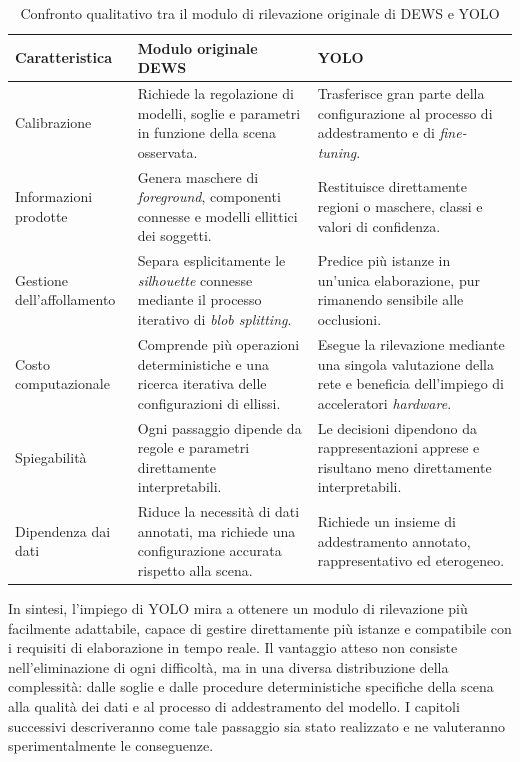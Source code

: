 \begin{table}[htbp]
    \centering
    \caption[Confronto tra il rilevatore originale di DEWS e YOLO]{Confronto qualitativo tra il modulo di rilevazione originale di DEWS e YOLO}
    \label{tab:confronto-dews-yolo}
    \footnotesize
    \renewcommand{\arraystretch}{1.20}
    \begin{tabularx}{\textwidth}{|>{\raggedright\arraybackslash}m{2.6cm}||>{\raggedright\arraybackslash}X|>{\raggedright\arraybackslash}X|}
        \hline
        Caratteristica & Modulo originale DEWS & YOLO \\
        \hline\hline
        Calibrazione & Richiede la regolazione di modelli, soglie e parametri in funzione della scena osservata. & Trasferisce gran parte della configurazione al processo di addestramento e di \textit{fine-tuning}. \\
        \hline
        Informazioni prodotte & Genera maschere di \textit{foreground}, componenti connesse e modelli ellittici dei soggetti. & Restituisce direttamente regioni o maschere, classi e valori di confidenza. \\
        \hline
        Gestione dell'affollamento & Separa esplicitamente le \textit{silhouette} connesse mediante il processo iterativo di \textit{blob splitting}. & Predice più istanze in un'unica elaborazione, pur rimanendo sensibile alle occlusioni. \\
        \hline
        Costo computazionale & Comprende più operazioni deterministiche e una ricerca iterativa delle configurazioni di ellissi. & Esegue la rilevazione mediante una singola valutazione della rete e beneficia dell'impiego di acceleratori \textit{hardware}. \\
        \hline
        Spiegabilità & Ogni passaggio dipende da regole e parametri direttamente interpretabili. & Le decisioni dipendono da rappresentazioni apprese e risultano meno direttamente interpretabili. \\
        \hline
        Dipendenza dai dati & Riduce la necessità di dati annotati, ma richiede una configurazione accurata rispetto alla scena. & Richiede un insieme di addestramento annotato, rappresentativo ed eterogeneo. \\
        \hline
    \end{tabularx}
\end{table}

In sintesi, l'impiego di YOLO mira a ottenere un modulo di rilevazione più facilmente adattabile, capace di gestire direttamente più istanze e compatibile con i requisiti di elaborazione in tempo reale. Il vantaggio atteso non consiste nell'eliminazione di ogni difficoltà, ma in una diversa distribuzione della complessità: dalle soglie e dalle procedure deterministiche specifiche della scena alla qualità dei dati e al processo di addestramento del modello. I capitoli successivi descriveranno come tale passaggio sia stato realizzato e ne valuteranno sperimentalmente le conseguenze.

